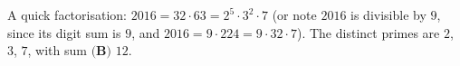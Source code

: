 A quick factorisation: $2016=32\cdot63=2^5\cdot3^2\cdot7$ (or note $2016$ is divisible by $9$, since its digit sum is $9$, and $2016=9\cdot224=9\cdot32\cdot7$). The distinct primes are $2$, $3$, $7$, with sum $\boxed{\textbf{(B) }12}$.
